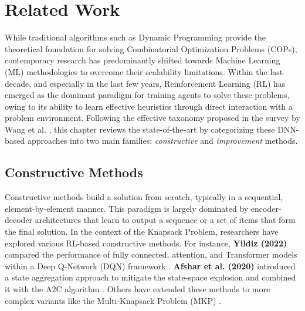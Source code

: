 \chapter{Related Work}
\label{chap:related_work}

While traditional algorithms such as Dynamic Programming provide the theoretical foundation for solving Combinatorial Optimization Problems (COPs), contemporary research has predominantly shifted towards Machine Learning (ML) methodologies to overcome their scalability limitations.
Within the last decade, and especially in the last few years, Reinforcement Learning (RL) has emerged as the dominant paradigm for training agents to solve these problems, owing to its ability to learn effective heuristics through direct interaction with a problem environment.
Following the effective taxonomy proposed in the survey by Wang et al. \cite{wangSolvingCombinatorialOptimization2024}, this chapter reviews the state-of-the-art by categorizing these DNN-based approaches into two main families: \textit{constructive} and \textit{improvement} methods.

\section{Constructive Methods}
Constructive methods build a solution from scratch, typically in a sequential, element-by-element manner.
This paradigm is largely dominated by encoder-decoder architectures that learn to output a sequence or a set of items that form the final solution.
In the context of the Knapsack Problem, researchers have explored various RL-based constructive methods. For instance, \textbf{Yildiz (2022)} compared the performance of fully connected, attention, and Transformer models within a Deep Q-Network (DQN) framework \cite{yildizReinforcementLearningUsing2022}. \textbf{Afshar et al. (2020)} introduced a state aggregation approach to mitigate the state-space explosion and combined it with the A2C algorithm \cite{afsharStateAggregationApproach2020}. Others have extended these methods to more complex variants like the Multi-Knapsack Problem (MKP) \cite{surDeepReinforcementLearningBased2022}.

